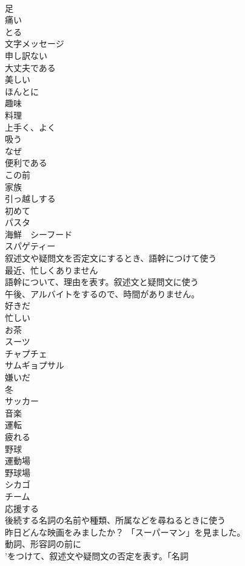 \documentclass[8pt]{extreport}
\begin{document}
\begin{CJK}{UTF8}{min}
\\	足
\\	痛い
\\	とる
\\	文字メッセージ
\\	申し訳ない
\\	大丈夫である
\\	美しい
\\	ほんとに
\\	趣味
\\	料理
\\	上手く、よく
\\	吸う
\\	なぜ
\\	便利である
\\	この前
\\	家族
\\	引っ越しする
\\	初めて
\\	パスタ
\\	海鮮　シーフード
\\	スパゲティー
\\	叙述文や疑問文を否定文にするとき、語幹につけて使う	
\\	最近、忙しくありません
\\	語幹について、理由を表す。叙述文と疑問文に使う	
\\	午後、アルバイトをするので、時間がありません。
\\	好きだ
\\	忙しい
\\	お茶
\\	スーツ
\\	チャプチェ
\\	サムギョプサル
\\	嫌いだ
\\	冬
\\	サッカー
\\	音楽
\\	運転
\\	疲れる
\\	野球
\\	運動場
\\	野球場
\\	シカゴ
\\	チーム
\\	応援する
\\	後続する名詞の名前や種類、所属などを尋ねるときに使う	
\\	昨日どんな映画をみましたか？ 「スーパーマン」を見ました。
\\	動詞、形容詞の前に
\\	'をつけて、叙述文や疑問文の否定を表す。「名詞

\end{CJK}
\end{document}
